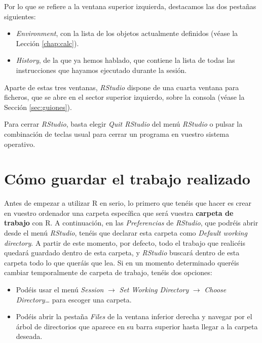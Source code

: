 \documentclass[
]{book}
\providecommand{\tightlist}{%
  \setlength{\itemsep}{0pt}\setlength{\parskip}{0pt}}
\theoremstyle{definition}
\theoremstyle{definition}
\theoremstyle{definition}
\theoremstyle{remark}
\begin{document}
Por lo que se refiere a la ventana superior izquierda, destacamos las dos pestañas siguientes:

\begin{itemize}
\tightlist
\item
  \emph{Environment}, con la lista de los objetos actualmente definidos (véase la Lección \ref{chap:calc}).
\item
  \emph{History}, de la que ya hemos hablado, que contiene la lista de todas las instrucciones que hayamos ejecutado durante la sesión.
\end{itemize}

Aparte de estas tres ventanas, \emph{RStudio} dispone de una cuarta ventana para ficheros, que se abre en el sector superior izquierdo, sobre la consola (véase la Sección \ref{sec:guiones}).

Para cerrar \emph{RStudio}, basta elegir \emph{Quit RStudio} del menú \emph{RStudio} o
pulsar la combinación de teclas usual para cerrar un programa en vuestro sistema operativo.

\hypertarget{sec:guardar}{%
\section{Cómo guardar el trabajo realizado}\label{sec:guardar}}

Antes de empezar a utilizar R en serio, lo primero que tenéis que hacer es crear en vuestro ordenador una carpeta específica que será vuestra \textbf{carpeta de trabajo} con R. A continuación, en las \emph{Preferencias} de \emph{RStudio}, que podréis abrir desde el menú \emph{RStudio}, tenéis que declarar esta carpeta como \emph{Default working directory}. A partir de este momento, por defecto, todo el trabajo que realicéis quedará guardado dentro de esta carpeta, y \emph{RStudio} buscará dentro de esta carpeta todo lo que queráis que lea.
Si en un momento determinado queréis cambiar temporalmente de carpeta de trabajo, tenéis dos opciones:

\begin{itemize}
\item
  Podéis usar el menú \emph{Session} \(\rightarrow\) \emph{Set Working Directory} \(\rightarrow\) \emph{Choose Directory\ldots{}} para escoger una carpeta.
\item
  Podéis abrir la pestaña \emph{Files} de la ventana inferior derecha y navegar por el árbol de directorios que aparece en su barra superior hasta llegar a la carpeta deseada.
\end{itemize}
\end{document}
